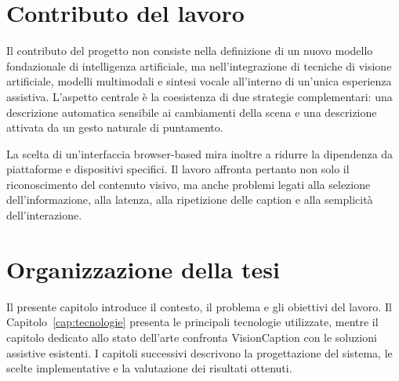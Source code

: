 \section{Contributo del lavoro}

Il contributo del progetto non consiste nella definizione di un nuovo modello
fondazionale di intelligenza artificiale, ma nell'integrazione di tecniche di
visione artificiale, modelli multimodali e sintesi vocale all'interno di
un'unica esperienza assistiva. L'aspetto centrale è la coesistenza di due
strategie complementari: una descrizione automatica sensibile ai cambiamenti
della scena e una descrizione attivata da un gesto naturale di puntamento.

La scelta di un'interfaccia browser-based mira inoltre a ridurre la dipendenza
da piattaforme e dispositivi specifici. Il lavoro affronta pertanto non solo il
riconoscimento del contenuto visivo, ma anche problemi legati alla selezione
dell'informazione, alla latenza, alla ripetizione delle caption e alla
semplicità dell'interazione.

\section{Organizzazione della tesi}

Il presente capitolo introduce il contesto, il problema e gli obiettivi del
lavoro. Il Capitolo~\ref{cap:tecnologie} presenta le principali tecnologie
utilizzate, mentre il capitolo dedicato allo stato dell'arte confronta
VisionCaption con le soluzioni assistive esistenti. I capitoli successivi
descrivono la progettazione del sistema, le scelte implementative e la
valutazione dei risultati ottenuti.

